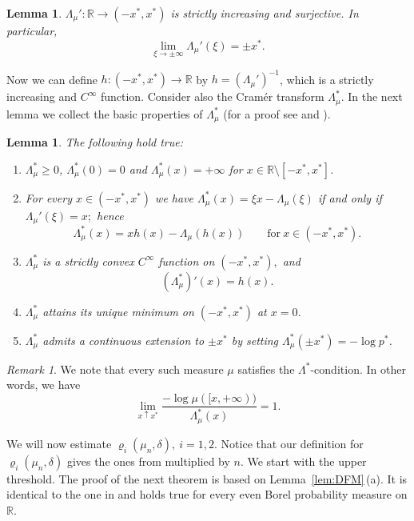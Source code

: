 \documentclass[11pt,a4paper]{article} %
\newtheorem{lemma}[theorem]{Lemma}
\theoremstyle{definition}
\theoremstyle{remark}
\newtheorem{remark}[theorem]{Remark}
\newcommand{\1}{\mathds{1}}
\newcommand{\gr}{\ge}
\begin{document}
\begin{lemma}\label{lem:Lambda-property} $\Lambda_\mu': \mathbb{R} \to (-x^\ast,x^\ast) $ is strictly increasing and surjective. In particular, $$\lim_{\xi\to \pm \infty}\Lambda_{\mu}'(\xi)=\pm x^{\ast} .$$
\end{lemma}

Now we can define $h:(-x^\ast,x^\ast) \to \mathbb{R}$ by $h=(\Lambda_{\mu}')^{-1}$, which is a strictly increasing and $C^{\infty}$ function. Consider also the Cram\'{e}r transform $\Lambda_{\mu}^{\ast}$. In the next lemma we collect the basic properties of $\Lambda_{\mu}^{\ast}$ (for a proof see \cite[Proposition 2.12]{GaGia2006} and \cite[Lemma 2.8]{GaGia}).

\begin{lemma}\label{lem:star-prop} The following hold true:
\begin{enumerate}
\item[{\rm (i)}]  $\Lambda_{\mu}^{\ast }\gr 0$, $\Lambda_{\mu}^{\ast }(0)=0$ and
$\Lambda_{\mu}^{\ast }(x)=+\infty$ for $x\in\mathbb{R}\setminus [-x^{\ast} ,x^{\ast}
]$.
\item[{\rm (ii)}] For every $x\in (-x^\ast,x^{\ast})$ we have
$\Lambda_{\mu}^{\ast }(x)=\xi x-\Lambda_{\mu}(\xi)$ if and only if $\Lambda_{\mu}'(\xi)=x;$ hence
$$\Lambda_{\mu}^{\ast }(x)=x h(x)-\Lambda_{\mu}(h(x)) \qquad\text{for}\ x\in(-x^\ast,x^{\ast}) .$$
\item[{\rm (iii)}] $\Lambda_{\mu}^{\ast }$ is a strictly convex
$C^\infty$ function on $(-x^\ast,x^{\ast}),$ and $$(\Lambda_{\mu}^{\ast })'(x)=h(x).$$
\item[{\rm (iv)}] $\Lambda_{\mu}^{\ast }$ attains its unique minimum on
$(-x^\ast,x^\ast)$ at $x=0$.
\item[{\rm (v)}] $\Lambda_{\mu }^{\ast }$ admits a continuous extension to $\pm x^\ast$ by setting $\Lambda_{\mu}^\ast(\pm x^\ast)=-\log p^\ast$.
\end{enumerate}
\end{lemma}

\begin{remark}
    We note that every such measure $\mu$ satisfies the $\Lambda^\ast$-condition. In other words, we have $$\lim\limits_{x\uparrow x^{\ast}}\dfrac{-\log \mu([x,+\infty))}{\Lambda_{\mu}^{\ast }(x)}=1.$$
\end{remark}

We will now estimate $\varrho_{i}(\mu_n,\delta), \ i=1,2$. Notice that our definition for $\varrho_{i}(\mu_n,\delta)$ gives the ones from \cite{Paf} multiplied by $n$.  We start with the upper threshold. The proof of the next theorem is based on Lemma~\ref{lem:DFM}\,(a). It is identical  to the one in \cite[Theorem 3.1]{Paf} and holds true for every even Borel probability measure on $\mathbb{R}$.
\end{document}
